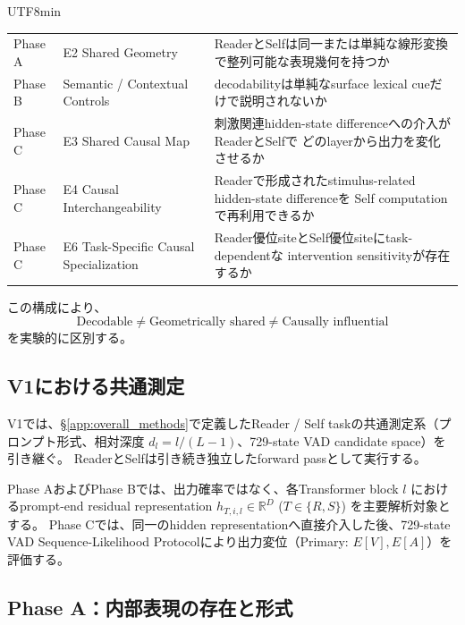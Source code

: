 \documentclass{article} %
\begin{document}
\begin{CJK*}{UTF8}{min}
\begin{table}[htbp]
\begin{tabularx}{\linewidth}{
@{}
>{\raggedright\arraybackslash}p{1.6cm}
>{\raggedright\arraybackslash}p{3.0cm}
>{\raggedright\arraybackslash}X
@{}
}
Phase A &
E2 Shared Geometry &
ReaderとSelfは同一または単純な線形変換で整列可能な表現幾何を持つか \\

Phase B &
Semantic / Contextual Controls &
decodabilityは単純なsurface lexical cueだけで説明されないか \\

Phase C &
E3 Shared Causal Map &
刺激関連hidden-state differenceへの介入がReaderとSelfで
どのlayerから出力を変化させるか \\

Phase C &
E4 Causal Interchangeability &
Readerで形成されたstimulus-related hidden-state differenceを
Self computationで再利用できるか \\

Phase C &
E6 Task-Specific Causal Specialization &
Reader優位siteとSelf優位siteにtask-dependentな
intervention sensitivityが存在するか \\
\bottomrule
\end{tabularx}
\end{table}

この構成により、
\[
\text{Decodable}
\neq
\text{Geometrically shared}
\neq
\text{Causally influential}
\]
を実験的に区別する。


\subsection{V1における共通測定}
\label{app:v1-common-measurements}

V1では、\S\ref{app:overall_methods}で定義したReader / Self taskの共通測定系（プロンプト形式、相対深度 $d_l = l/(L-1)$、729-state VAD candidate space）を引き継ぐ。
ReaderとSelfは引き続き独立したforward passとして実行する。

Phase AおよびPhase Bでは、出力確率ではなく、各Transformer block $l$ におけるprompt-end residual representation $h_{T,i,l} \in \mathbb{R}^D$ ($T \in \{R, S\}$) を主要解析対象とする。
Phase Cでは、同一のhidden representationへ直接介入した後、729-state VAD Sequence-Likelihood Protocolにより出力変位（Primary: $E[V], E[A]$）を評価する。



\subsection{Phase A：内部表現の存在と形式}
\label{app:v1-phase-a}


\end{CJK*}
\end{document}
